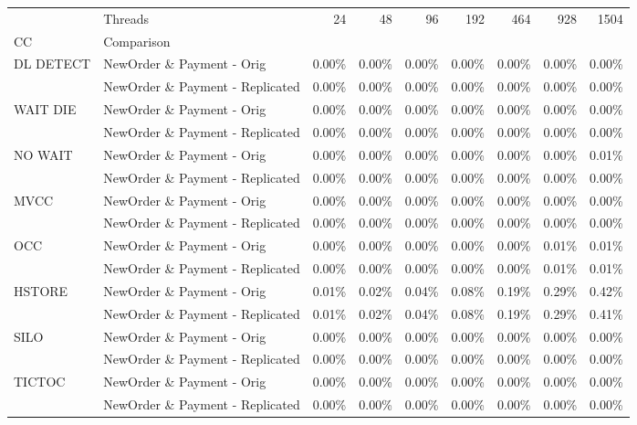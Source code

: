 \begin{tabular}{llrrrrrrr}
\toprule
       & Threads &  24   &  48   &  96   &  192  &  464  &  928  &  1504 \\
CC & Comparison &       &       &       &       &       &       &       \\
\midrule
DL DETECT & NewOrder \& Payment - Orig & 0.00\% & 0.00\% & 0.00\% & 0.00\% & 0.00\% & 0.00\% & 0.00\% \\
       & NewOrder \& Payment - Replicated & 0.00\% & 0.00\% & 0.00\% & 0.00\% & 0.00\% & 0.00\% & 0.00\% \\
WAIT DIE & NewOrder \& Payment - Orig & 0.00\% & 0.00\% & 0.00\% & 0.00\% & 0.00\% & 0.00\% & 0.00\% \\
       & NewOrder \& Payment - Replicated & 0.00\% & 0.00\% & 0.00\% & 0.00\% & 0.00\% & 0.00\% & 0.00\% \\
NO WAIT & NewOrder \& Payment - Orig & 0.00\% & 0.00\% & 0.00\% & 0.00\% & 0.00\% & 0.00\% & 0.01\% \\
       & NewOrder \& Payment - Replicated & 0.00\% & 0.00\% & 0.00\% & 0.00\% & 0.00\% & 0.00\% & 0.00\% \\
MVCC & NewOrder \& Payment - Orig & 0.00\% & 0.00\% & 0.00\% & 0.00\% & 0.00\% & 0.00\% & 0.00\% \\
       & NewOrder \& Payment - Replicated & 0.00\% & 0.00\% & 0.00\% & 0.00\% & 0.00\% & 0.00\% & 0.00\% \\
OCC & NewOrder \& Payment - Orig & 0.00\% & 0.00\% & 0.00\% & 0.00\% & 0.00\% & 0.01\% & 0.01\% \\
       & NewOrder \& Payment - Replicated & 0.00\% & 0.00\% & 0.00\% & 0.00\% & 0.00\% & 0.01\% & 0.01\% \\
HSTORE & NewOrder \& Payment - Orig & 0.01\% & 0.02\% & 0.04\% & 0.08\% & 0.19\% & 0.29\% & 0.42\% \\
       & NewOrder \& Payment - Replicated & 0.01\% & 0.02\% & 0.04\% & 0.08\% & 0.19\% & 0.29\% & 0.41\% \\
SILO & NewOrder \& Payment - Orig & 0.00\% & 0.00\% & 0.00\% & 0.00\% & 0.00\% & 0.00\% & 0.00\% \\
       & NewOrder \& Payment - Replicated & 0.00\% & 0.00\% & 0.00\% & 0.00\% & 0.00\% & 0.00\% & 0.00\% \\
TICTOC & NewOrder \& Payment - Orig & 0.00\% & 0.00\% & 0.00\% & 0.00\% & 0.00\% & 0.00\% & 0.00\% \\
       & NewOrder \& Payment - Replicated & 0.00\% & 0.00\% & 0.00\% & 0.00\% & 0.00\% & 0.00\% & 0.00\% \\
\bottomrule
\end{tabular}
